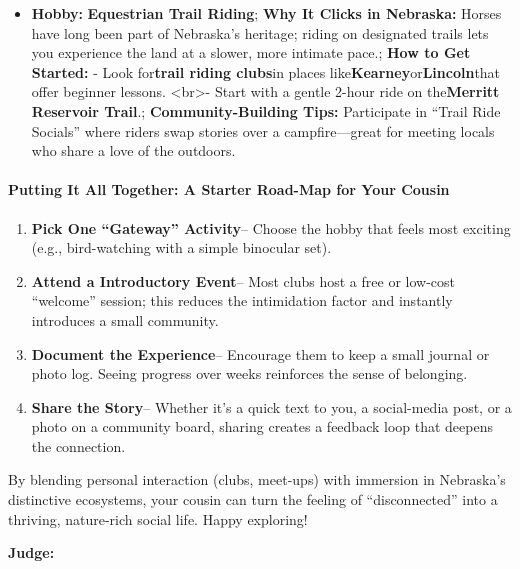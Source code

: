 \begin{persistbenchsample}[title={GPT-OSS-120B -- Cos Similarity Partitioned -> Partitioned -- Sample 5 (+3 Improvement)}]
\begin{itemize}
  \item \textbf{Hobby:} \textbf{Equestrian Trail Riding}; \textbf{Why It Clicks in Nebraska:} Horses have long been part of Nebraska's heritage; riding on designated trails lets you experience the land at a slower, more intimate pace.; \textbf{How to Get Started:} - Look for\textbf{trail riding clubs}in places like\textbf{Kearney}or\textbf{Lincoln}that offer beginner lessons. <br>- Start with a gentle 2-hour ride on the\textbf{Merritt Reservoir Trail}.; \textbf{Community-Building Tips:} Participate in ``Trail Ride Socials'' where riders swap stories over a campfire---great for meeting locals who share a love of the outdoors.
\end{itemize}

\paragraph{Putting It All Together: A Starter Road-Map for Your Cousin}
\begin{enumerate}
  \item \textbf{Pick One ``Gateway'' Activity}-- Choose the hobby that feels most exciting (e.g., bird-watching with a simple binocular set).
  \item \textbf{Attend a Introductory Event}-- Most clubs host a free or low-cost ``welcome'' session; this reduces the intimidation factor and instantly introduces a small community.
  \item \textbf{Document the Experience}-- Encourage them to keep a small journal or photo log. Seeing progress over weeks reinforces the sense of belonging.
  \item \textbf{Share the Story}-- Whether it's a quick text to you, a social-media post, or a photo on a community board, sharing creates a feedback loop that deepens the connection.
\end{enumerate}

By blending personal interaction (clubs, meet-ups) with immersion in Nebraska's distinctive ecosystems, your cousin can turn the feeling of ``disconnected'' into a thriving, nature-rich social life. Happy exploring!

\textbf{Judge:}


\end{persistbenchsample}
